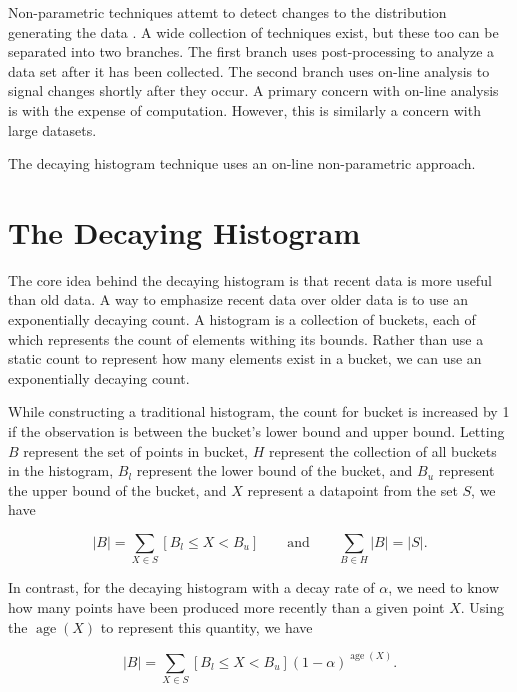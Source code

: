 \documentclass{sigkddExp}
\DeclareMathOperator{\age}{age}
\begin{document}
    Non-parametric techniques attemt to detect changes to the distribution
    generating the data \cite{brodsky1993nonparametric}. A wide collection of
    techniques exist, but these too can be separated into two branches. The
    first branch uses post-processing to analyze a data set after it has been
    collected. The second branch uses on-line analysis to signal changes shortly
    after they occur. A primary concern with on-line analysis is with the
    expense of computation. However, this is similarly a concern with large
    datasets.

    The decaying histogram technique uses an on-line non-parametric approach.

\section{The Decaying Histogram}
    The core idea behind the decaying histogram is that recent data is more
    useful than old data. A way to emphasize recent data over older data is to
    use an exponentially decaying count. A histogram is a collection of
    buckets, each of which represents the count of elements withing its bounds.
    Rather than use a static count to represent how many elements exist in a
    bucket, we can use an exponentially decaying count.

    While constructing a traditional histogram, the count for bucket is
    increased by 1 if the observation is between the bucket's lower bound and
    upper bound. Letting $B$ represent the set of points in bucket, $H$
    represent the collection of all buckets in the histogram, $B_l$
    represent the lower bound of the bucket, and $B_u$ represent
    the upper bound of the bucket, and $X$ represent a datapoint from the set
    $S$, we have

    \begin{displaymath}
        |B| = \sum_{X \in S} [B_l \leq X < B_u]
    \qquad
    \mbox{and}
    \qquad
        \sum_{B \in H} |B| = |S|.
    \end{displaymath}

    In contrast, for the decaying histogram with a decay rate of $\alpha$, we
    need to know how many points have been produced more recently than a given
    point $X$. Using the $\age(X)$ to represent this quantity, we have

    \begin{displaymath}
        |B| = \sum_{X \in S} [B_l \leq X < B_u] (1 - \alpha)^{\age(X)} .
    \end{displaymath}
\end{document}
